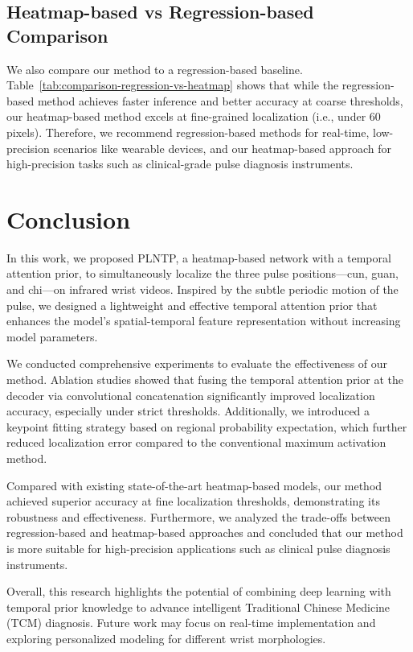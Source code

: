 \documentclass[twocolumn]{article}
\begin{document}
\subsection{Heatmap-based vs Regression-based Comparison}
We also compare our method to a regression-based baseline. Table~\ref{tab:comparison-regression-vs-heatmap} shows that while the regression-based method achieves faster inference and better accuracy at coarse thresholds, our heatmap-based method excels at fine-grained localization (i.e., under 60 pixels). Therefore, we recommend regression-based methods for real-time, low-precision scenarios like wearable devices, and our heatmap-based approach for high-precision tasks such as clinical-grade pulse diagnosis instruments.


\section{Conclusion}
In this work, we proposed PLNTP, a heatmap-based network with a temporal attention prior, to simultaneously localize the three pulse positions—cun, guan, and chi—on infrared wrist videos. Inspired by the subtle periodic motion of the pulse, we designed a lightweight and effective temporal attention prior that enhances the model’s spatial-temporal feature representation without increasing model parameters.

We conducted comprehensive experiments to evaluate the effectiveness of our method. Ablation studies showed that fusing the temporal attention prior at the decoder via convolutional concatenation significantly improved localization accuracy, especially under strict thresholds. Additionally, we introduced a keypoint fitting strategy based on regional probability expectation, which further reduced localization error compared to the conventional maximum activation method.

Compared with existing state-of-the-art heatmap-based models, our method achieved superior accuracy at fine localization thresholds, demonstrating its robustness and effectiveness. Furthermore, we analyzed the trade-offs between regression-based and heatmap-based approaches and concluded that our method is more suitable for high-precision applications such as clinical pulse diagnosis instruments.

Overall, this research highlights the potential of combining deep learning with temporal prior knowledge to advance intelligent Traditional Chinese Medicine (TCM) diagnosis. Future work may focus on real-time implementation and exploring personalized modeling for different wrist morphologies.



\end{document}
